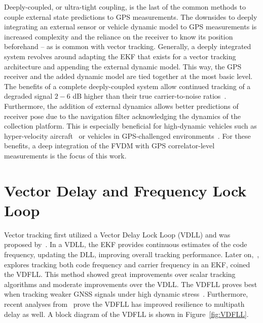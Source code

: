{Deeply-coupled}, or ultra-tight coupling, is the last of the common methods to couple external state predictions to GPS measurements. The downsides to deeply integrating an external sensor or vehicle dynamic model to GPS measurements is increased complexity and the reliance on the receiver to know its position beforehand {--} as is common with vector tracking. Generally, a deeply integrated system revolves around adapting the EKF that exists for a vector tracking architecture and appending the external dynamic model. This way, the GPS receiver and the added dynamic model are tied together at the most basic level. The benefits of a complete deeply-coupled system allow continued tracking of a degraded signal \(2-6\) dB higher than their true carrier-to-noise ratios~\cite{wattsGPSGLONASSL12019}. Furthermore, the addition of external dynamics allows better predictions of receiver pose due to the navigation filter acknowledging the dynamics of the collection platform. This is especially beneficial for high-dynamic vehicles such as hyper-velocity aircraft~\cite{pozzobonSupersonicGNSSAuthentication2014} or vehicles in GPS-challenged environments~\cite{martinGPSCarrierPhase2017}. For these benefits, a deep integration of the FVDM with GPS correlator-level measurements is the focus of this work.

\section{\textbf{Vector Delay and Frequency Lock Loop}}
Vector tracking first utilized a Vector Delay Lock Loop (VDLL) and was proposed by~\cite{e.m.coppsOptimalProcessingGPS1980}. In a VDLL\@, the EKF provides continuous estimates of the code frequency, updating the DLL, improving overall tracking performance. Later on,~\cite{bradfordparkinsonGlobalPositioningSystem1996}, explores tracking both code frequency and carrier frequency in an EKF, coined the VDFLL\@. This method showed great improvements over scalar tracking algorithms and moderate improvements over the VDLL\@. The VDFLL proves best when tracking weaker GNSS signals under high dynamic stress~\cite{lashleyPerformanceAnalysisVector2009}. Furthermore, recent analyses from~\cite{ziedanMultipathChannelEstimation2012} prove the VDFLL has improved resilience to multipath delay as well. A block diagram of the VDFLL is shown in Figure~\ref{fig:VDFLL}.

